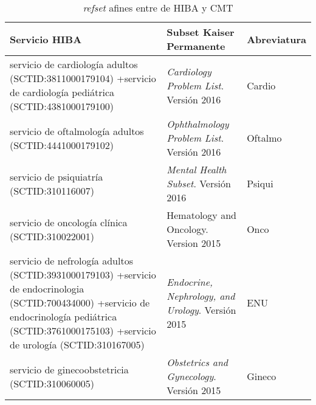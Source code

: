 \begin{table}[htb]
\centering
\caption{\textit{\acrshort{refset}}  afines entre de \acrshort{HIBA} y \acrshort{CMT}}
\label{subsetsComparacion}
\begin{tabularx}{\textwidth}{@{}XXl@{}}
\toprule
Servicio HIBA                                                                                                              & Subset Kaiser Permanente & Abreviatura                         \\ \midrule
servicio de cardiología adultos \newline (SCTID:3811000179104) +\newline  servicio de cardiología pediátrica  \newline (SCTID:4381000179100)                                                   & \textit{Cardiology Problem List}. Versión 2016          & Cardio  \\
servicio de oftalmología adultos \newline (SCTID:4441000179102)                                                                                             & \textit{Ophthalmology Problem List}. Versión 2016        & Oftalmo \\
servicio de psiquiatría  \newline (SCTID:310116007)                                                                                                     & \textit{Mental Health Subset}. Versión 2016          & Psiqui     \\
servicio de oncología clínica   \newline (SCTID:310022001)                                                                                              & Hematology and Oncology. Version 2015       & Onco     \\
servicio de nefrología adultos \newline (SCTID:3931000179103)  +\newline  servicio de endocrinologia  \newline (SCTID:700434000)  +\newline  servicio de endocrinología pediátrica \newline (SCTID:3761000175103) +\newline  servicio de urología \newline (SCTID:310167005)  & \textit{Endocrine, Nephrology, and Urology}. Versión 2015  & ENU \\
servicio de ginecoobstetricia  \newline (SCTID:310060005)                                                                                           & \textit{Obstetrics and Gynecology}. Versión 2015        & Gineco  \\

\end{tabularx}
\end{table}
